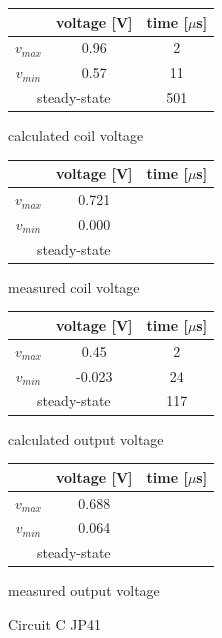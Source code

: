 \documentclass[notitlepage, a4paper, 11pt]{article}
\begin{document}
	\begin{figure}[H]
		\begin{subtable}{0.45 \textwidth}
	\centering
	\begin{tabular}{|c|c|c|}
	\hline
& voltage [V] & time [$\mu$s] \\
\hline
$v_{max}$ & 0.96 & 2 \\
\hline
$v_{min}$ & 0.57 & 11 \\
\hline
\multicolumn{2}{|c|}{ steady-state} & 501 \\
\hline
	\end{tabular}
	\caption{calculated coil voltage}
\end{subtable}
\hfill
\begin{subtable}{0.45 \textwidth}
	\centering
	\begin{tabular}{|c|c|c|}
		\hline
		& voltage [V] & time [$\mu$s] \\
		\hline
		$v_{max}$ & 0.721 &  \\
		\hline
		$v_{min}$ & 0.000 & \\
		\hline
		\multicolumn{2}{|c|}{ steady-state} & \\
		\hline
	\end{tabular}
	\caption{measured coil voltage}
\end{subtable}
\begin{subtable}{0.45 \textwidth}
	\centering
	\begin{tabular}{|c|c|c|}
	\hline
& voltage [V] & time [$\mu$s] \\
\hline
$v_{max}$ & 0.45 & 2 \\
\hline
$v_{min}$ & -0.023 & 24 \\
\hline
\multicolumn{2}{|c|}{ steady-state} & 117 \\
\hline
	\end{tabular}
	\caption{calculated output voltage}
\end{subtable}
\hfill
\begin{subtable}{0.45 \textwidth}
	\centering
	\begin{tabular}{|c|c|c|}
	\hline
& voltage [V] & time [$\mu$s] \\
\hline
$v_{max}$ & 0.688 & \\
\hline
$v_{min}$ & 0.064 & \\
\hline
\multicolumn{2}{|c|}{ steady-state} & \\
\hline
	\end{tabular}
	\caption{measured output voltage}
\end{subtable}
		\caption{Circuit C JP41}
	\end{figure}
	
\end{document}
